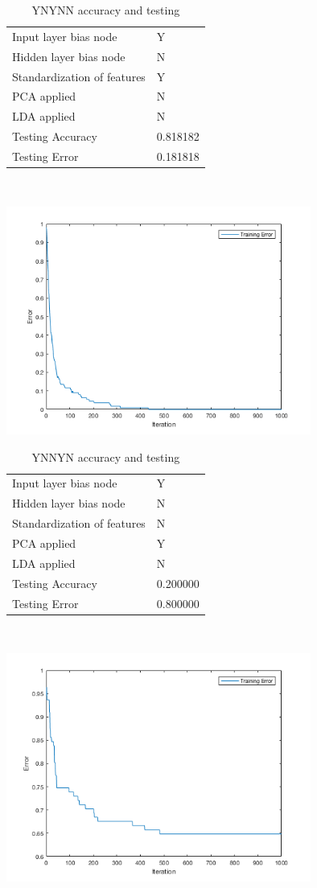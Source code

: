 \documentclass[12pt]{article}
\newcommand{\accuracyAndTestErrorTable}[8]{
  \begin{tabular}{l|l}
    \hline
    Input layer bias node & #1 \\
    Hidden layer bias node & #2 \\
    Standardization of features & #3 \\
    PCA applied & #4 \\
    LDA applied & #5 \\
    \hline
    Testing Accuracy & #6 \\
    Testing Error & #7 \\
    \hline
  \end{tabular}
  ~\\[60pt]
  \caption{#8}
}
\begin{document}
\begin{center}
  \begin{table}[H]
    \begin{varwidth}[b]{0.4\linewidth}
      \centering
      \accuracyAndTestErrorTable{Y}{N}{Y}{N}{N}{0.818182}{0.181818}{YNYNN accuracy and testing}
      \label{table:YNYNN}
    \end{varwidth}%
    \hfill
    \begin{minipage}[b]{0.6\linewidth}
      \centering
      \includegraphics[width=100mm]{YNYNN_training_error.png}
      \label{fig:YNYNN}
    \end{minipage}
  \end{table}
\end{center}

\begin{center}
  \begin{table}[H]
    \begin{varwidth}[b]{0.4\linewidth}
      \centering
      \accuracyAndTestErrorTable{Y}{N}{N}{Y}{N}{0.200000}{0.800000}{YNNYN accuracy and testing}
      \label{table:YNNYN}
    \end{varwidth}%
    \hfill
    \begin{minipage}[b]{0.6\linewidth}
      \centering
      \includegraphics[width=100mm]{YNNYN_training_error.png}
      \label{fig:YNNYN}
    \end{minipage}
  \end{table}
\end{center}
\end{document}
